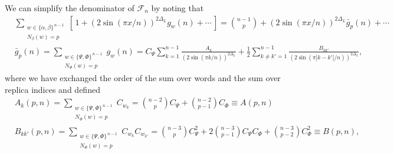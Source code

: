 \documentclass[11pt]{article}
\newcommand{\nn}{\nonumber}
\begin{document}
  We can simplify the denominator of $\mathcal{F}_{n}$ by noting that
  \begin{align}
     & \sum_{\substack{w\in\{\alpha,\beta\}^{\,n-1}\\ N_\beta(w)=p}}\left[\,1+(2\sin(\pi x/n))^{2\Delta_L}g_{w}(n)+\cdots\,\right]=\binom{n-1}{p}+(2\sin(\pi x/n))^{2\Delta_L}\bar{g}_{p}(n)+\cdots\,\nn                                   \\
    &\bar{g}_{p}(n) =\sum_{\substack{w\in\{\Psi,\Phi\}^{\,n-1}\\ N_\Phi(w)=p}}g_{w}(n)=C_{\Psi}\sum_{k=1}^{n-1}\frac{A_{k}}{(2\sin(\pi k/n))^{2\Delta_L}}+\frac{1}{2}\sum_{k\neq k'=1}^{n-1}\frac{B_{kk'}}{(2\sin(\pi |k-k'|/n))^{2\Delta_L}},
  \end{align}
  where we have exchanged the order of the sum over words and the sum over
  replica indices and defined
  \begin{align}
      & A_{k}(p,n)=\sum_{\substack{w\in\{\Psi,\Phi\}^{\,n-1}\\ N_\Phi(w)=p}}C_{w_k}=\binom{n-2}{p}C_{\Psi}+\binom{n-2}{p-1}C_{\Phi}\equiv A(p,n)\nn  \\
     & B_{kk'}(p,n)=\sum_{\substack{w\in\{\Psi,\Phi\}^{\,n-1}\\ N_\Phi(w)=p}}C_{w_k}C_{w_{k'}}=\binom{n-3}{p}C_{\Psi}^{2}+2\binom{n-3}{p-1}C_{\Psi}C_{\Phi}+\binom{n-3}{p-2}C_{\Phi}^{2}\equiv B(p,n),
  \end{align}
\end{document}
